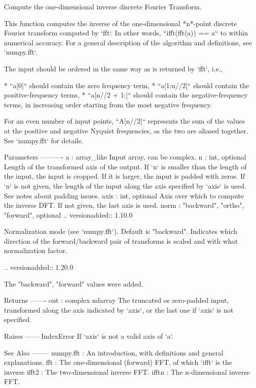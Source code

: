 \begin{DoxyVerb}Compute the one-dimensional inverse discrete Fourier Transform.

This function computes the inverse of the one-dimensional *n*-point
discrete Fourier transform computed by `fft`.  In other words,
``ifft(fft(a)) == a`` to within numerical accuracy.
For a general description of the algorithm and definitions,
see `numpy.fft`.

The input should be ordered in the same way as is returned by `fft`,
i.e.,

* ``a[0]`` should contain the zero frequency term,
* ``a[1:n//2]`` should contain the positive-frequency terms,
* ``a[n//2 + 1:]`` should contain the negative-frequency terms, in
  increasing order starting from the most negative frequency.

For an even number of input points, ``A[n//2]`` represents the sum of
the values at the positive and negative Nyquist frequencies, as the two
are aliased together. See `numpy.fft` for details.

Parameters
----------
a : array_like
    Input array, can be complex.
n : int, optional
    Length of the transformed axis of the output.
    If `n` is smaller than the length of the input, the input is cropped.
    If it is larger, the input is padded with zeros.  If `n` is not given,
    the length of the input along the axis specified by `axis` is used.
    See notes about padding issues.
axis : int, optional
    Axis over which to compute the inverse DFT.  If not given, the last
    axis is used.
norm : {"backward", "ortho", "forward"}, optional
    .. versionadded:: 1.10.0

    Normalization mode (see `numpy.fft`). Default is "backward".
    Indicates which direction of the forward/backward pair of transforms
    is scaled and with what normalization factor.

    .. versionadded:: 1.20.0

        The "backward", "forward" values were added.

Returns
-------
out : complex ndarray
    The truncated or zero-padded input, transformed along the axis
    indicated by `axis`, or the last one if `axis` is not specified.

Raises
------
IndexError
    If `axis` is not a valid axis of `a`.

See Also
--------
numpy.fft : An introduction, with definitions and general explanations.
fft : The one-dimensional (forward) FFT, of which `ifft` is the inverse
ifft2 : The two-dimensional inverse FFT.
ifftn : The n-dimensional inverse FFT.


\end{DoxyVerb}
